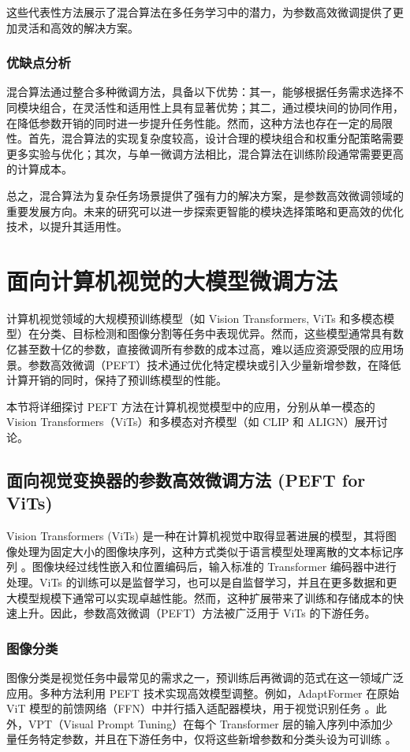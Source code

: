 \documentclass[12pt,a4paper,twoside]{article} %
\begin{document}
\begin{multicols}{2}
这些代表性方法展示了混合算法在多任务学习中的潜力，为参数高效微调提供了更加灵活和高效的解决方案。


\subsubsection{优缺点分析}
混合算法通过整合多种微调方法，具备以下优势：其一，能够根据任务需求选择不同模块组合，在灵活性和适用性上具有显著优势；其二，通过模块间的协同作用，在降低参数开销的同时进一步提升任务性能。然而，这种方法也存在一定的局限性。首先，混合算法的实现复杂度较高，设计合理的模块组合和权重分配策略需要更多实验与优化；其次，与单一微调方法相比，混合算法在训练阶段通常需要更高的计算成本。

总之，混合算法为复杂任务场景提供了强有力的解决方案，是参数高效微调领域的重要发展方向。未来的研究可以进一步探索更智能的模块选择策略和更高效的优化技术，以提升其适用性。

\section{面向计算机视觉的大模型微调方法}

计算机视觉领域的大规模预训练模型（如 Vision Transformers, ViTs 和多模态模型）在分类、目标检测和图像分割等任务中表现优异。然而，这些模型通常具有数亿甚至数十亿的参数，直接微调所有参数的成本过高，难以适应资源受限的应用场景。参数高效微调（PEFT）技术通过优化特定模块或引入少量新增参数，在降低计算开销的同时，保持了预训练模型的性能。

本节将详细探讨 PEFT 方法在计算机视觉模型中的应用，分别从单一模态的 Vision Transformers（ViTs）和多模态对齐模型（如 CLIP 和 ALIGN）展开讨论。


\subsection{面向视觉变换器的参数高效微调方法 (PEFT for ViTs)}

Vision Transformers (ViTs) 是一种在计算机视觉中取得显著进展的模型，其将图像处理为固定大小的图像块序列，这种方式类似于语言模型处理离散的文本标记序列 \cite{vit_survey}。图像块经过线性嵌入和位置编码后，输入标准的 Transformer 编码器中进行处理。ViTs 的训练可以是监督学习，也可以是自监督学习，并且在更多数据和更大模型规模下通常可以实现卓越性能。然而，这种扩展带来了训练和存储成本的快速上升。因此，参数高效微调（PEFT）方法被广泛用于 ViTs 的下游任务。

\subsubsection{图像分类}
图像分类是视觉任务中最常见的需求之一，预训练后再微调的范式在这一领域广泛应用。多种方法利用 PEFT 技术实现高效模型调整。例如，AdaptFormer 在原始 ViT 模型的前馈网络（FFN）中并行插入适配器模块，用于视觉识别任务 \cite{adaptformer}。此外，VPT（Visual Prompt Tuning）在每个 Transformer 层的输入序列中添加少量任务特定参数，并且在下游任务中，仅将这些新增参数和分类头设为可训练 \cite{vpt}。


\end{multicols}
\end{document}

